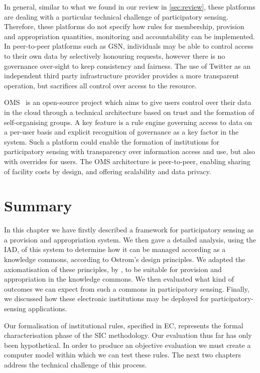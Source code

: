 In general, similar to what we found in our review in \autoref{sec:review}, these platforms are dealing with a particular technical challenge of participatory sensing. 
Therefore, these platforms do not specify how rules for membership, provision and appropriation quantities, monitoring and accountability can be implemented. 
In peer-to-peer platforms such as \ac{GSN}, individuals may be able to control access to their own data by selectively honouring requests, however there is no governance over-sight to keep consistency and fairness. 
The use of Twitter as an independent third party infrastructure provider provides a more transparent operation, but sacrifices all control over access to the resource.

\ac{OMS}~\citep{Hardjono2014,Hardjono2014a} is an open-source project which aims to give users control over their data in the cloud through a technical architecture based on trust and the formation of self-organising groups. 
A key feature is a rule engine governing access to data on a per-user basis and explicit recognition of governance as a key factor in the system.
Such a platform could enable the formation of institutions for participatory sensing with transparency over information access and use, but also with overrides for users. 
The \ac{OMS} architecture is peer-to-peer, enabling sharing of facility costs by design, and offering scalability and data privacy. 


\section{Summary}\label{sec:conclude}

In this chapter we have firstly described a framework for participatory sensing as a provision and appropriation system. We then gave a detailed analysis, using the \ac{IAD}, of this system to determine how it can be managed according as a knowledge commons, according to Ostrom's design principles. We adapted the axiomatisation of these principles, by \citet{Pitt2012b}, to be suitable for provision and appropriation in the knowledge commons. We then evaluated what kind of outcomes we can expect from such a commons in participatory sensing. Finally, we discussed how these electronic institutions may be deployed for participatory-sensing applications.

Our formalisation of institutional rules, specified in \ac{EC}, represents the formal characterisation phase of the \ac{SIC} methodology. Our evaluation thus far has only been hypothetical. In order to produce an objective evaluation we must create a computer model within which we can test these rules. The next two chapters address the technical challenge of this process.

